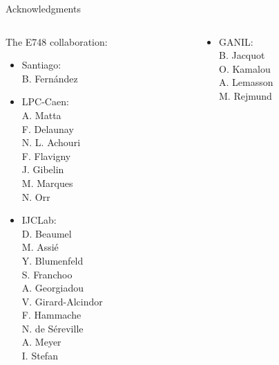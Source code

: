 \documentclass[aspectratio=43, dvipsnames]{beamer}
\begin{document}
\begin{frame}[plain]{Acknowledgments}
    \begin{columns}[T]
        \begin{column}{0.33\linewidth}
            The E748 collaboration:
            \begin{itemize}\scriptsize
                \item Santiago:\\
                      B. Fernández
                \item LPC-Caen:\\
                      A. Matta\\
                      F. Delaunay\\
                      N. L. Achouri\\
                      F. Flavigny\\
                      J. Gibelin\\
                      M. Marques\\
                      N. Orr
                \item IJCLab:\\
                      D. Beaumel\\
                      M. Assié\\
                      Y. Blumenfeld\\
                      S. Franchoo\\
                      A. Georgiadou\\
                      V. Girard-Alcindor\\
                      F. Hammache\\
                      N. de Séreville\\
                      A. Meyer\\
                      I. Stefan
            \end{itemize}
        \end{column}
        \begin{column}{0.33\linewidth}
            \begin{itemize}\scriptsize
                \item GANIL:\\
                      B. Jacquot\\
                      O. Kamalou\\
                      A. Lemasson\\
                      M. Rejmund\\

\end{itemize}
\end{column}
\end{columns}
\end{frame}
\end{document}
